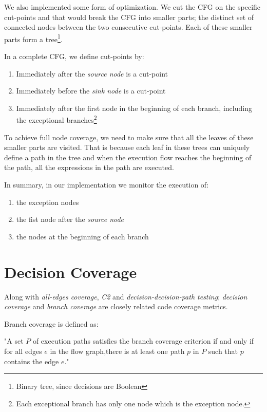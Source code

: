 \documentclass[12pt,a4paper]{report}
\begin{document}
We also implemented some form of optimization. We cut the CFG on the specific cut-points and that would break the CFG into smaller parts; the distinct set of connected nodes between the two consecutive cut-points. Each of these smaller parts form a tree\footnote{Binary tree, since decisions are Boolean}.

In a complete CFG, we define cut-points by:  

\begin{enumerate}
 \item Immediately after the \emph{source node} is a cut-point
 \item Immediately before the \emph{sink node} is a cut-point
 \item Immediately after the first node in the beginning of each branch, including the exceptional branches\footnote{Each exceptional branch has only one node which is the exception node.} 
\end{enumerate}

To achieve full node coverage, we need to make sure that all the leaves of these smaller parts are visited. That is because each leaf in these trees can uniquely define a path in the tree and when the execution flow reaches the beginning of the path, all the expressions in the path are executed.

In summary, in our implementation we monitor the execution of:

\begin{enumerate}
 \item the exception nodes
 \item the fist node after the \emph{source node}
 \item the nodes at the beginning of each branch
\end{enumerate}

\section{Decision Coverage}
Along with \emph{all-edges coverage}, \emph{C2} and \emph{decision-decision-path testing}; \emph{decision coverage} and \emph{branch coverage} are closely related code coverage metrics.

Branch coverage is defined as:

"A set $P$ of execution paths satisfies the branch coverage criterion if and only if for all edges $e$ in the flow graph,there is at least one path $p$ in $P$ such that $p$ contains the edge $e$."\cite{Zhu:1997:SUT:267580.267590}
\end{document}
